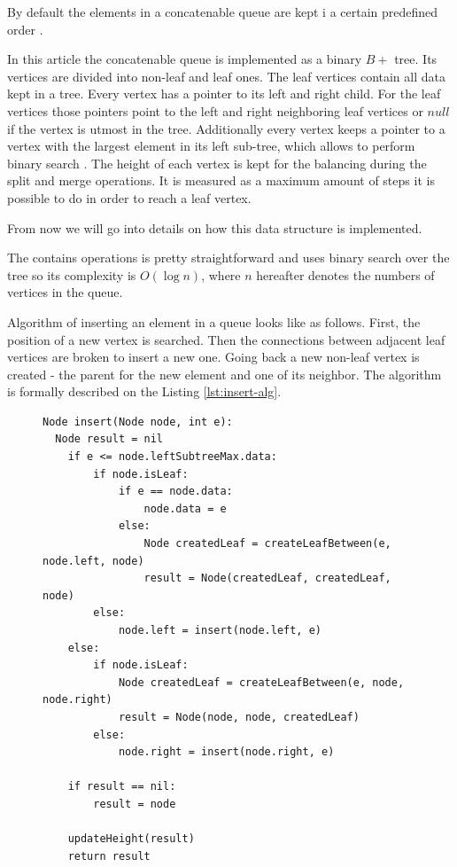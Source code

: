 \documentclass[a4paper,english,numberwithinsect,notab]{eurocg20-submission}
\begin{document}
	By default the elements in a concatenable queue are kept i a certain predefined order \cite[pp..~155-157]{aho}.
	
	In this article the concatenable queue is implemented as a binary  $B+$ tree. Its vertices are divided into non-leaf and leaf ones. The leaf vertices contain all data kept in a tree. Every vertex has a pointer to its left and right child. For the leaf vertices those pointers point to the left and right neighboring leaf vertices or $null$ if the vertex is utmost in the tree. 
	Additionally every vertex keeps a pointer to a vertex with the largest element in its left sub-tree, which  allows to perform binary search \cite[pp..~155-157]{aho}. The height of each vertex is kept for the balancing during the split and merge operations. It is measured as a maximum amount of steps it is possible to do in order to reach a leaf vertex.
	
	From now we will go into details on how this data structure is implemented. 
	
	The contains operations is pretty straightforward and uses binary search over the tree so its complexity is $O(\log n)$, where $n$ hereafter denotes the numbers of vertices in the queue.
	
	Algorithm of inserting an element in a queue looks like as follows. First, the position of a new vertex is searched. Then the connections between adjacent leaf vertices are broken to insert a new one. Going back a new non-leaf vertex is created - the parent for the new element and one of its neighbor. The algorithm is formally described on the Listing \ref{lst:insert-alg}.
	
	\begin{figure}[htbp]
		\begin{lstlisting}[caption={Queue insertion algorithm},label={lst:insert-alg},captionpos=b]
Node insert(Node node, int e):
  Node result = nil
    if e <= node.leftSubtreeMax.data:
        if node.isLeaf:
            if e == node.data:
                node.data = e
            else:
                Node createdLeaf = createLeafBetween(e, node.left, node)
                result = Node(createdLeaf, createdLeaf, node)
        else:
            node.left = insert(node.left, e)
    else:
        if node.isLeaf:
            Node createdLeaf = createLeafBetween(e, node, node.right)
            result = Node(node, node, createdLeaf)
        else:
            node.right = insert(node.right, e)

    if result == nil:
        result = node

    updateHeight(result)
    return result

		\end{lstlisting}
	\end{figure}
	
\end{document}
